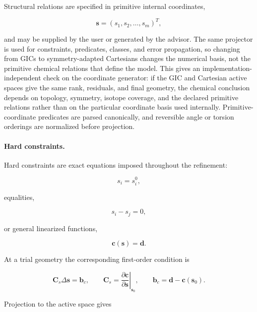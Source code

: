 \documentclass[aip,jcp,reprint,longbibliography,floatfix]{revtex4-2}
\begin{document}
Structural relations are specified in primitive internal coordinates,

\begin{equation}
\mathbf{s} = (s_1,s_2,\ldots,s_m)^T ,
\end{equation}

and may be supplied by the user or generated by the advisor. The same
projector is used for constraints, predicates, classes, and error propagation,
so changing from GICs to symmetry-adapted Cartesians changes the numerical
basis, not the primitive chemical relations that define the model.
This gives an implementation-independent check on the coordinate generator:
if the GIC and Cartesian active spaces give the same rank, residuals, and final
geometry, the chemical conclusion depends on topology, symmetry, isotope
coverage, and the declared primitive relations rather than on the particular
coordinate basis used internally.
Primitive-coordinate predicates are parsed canonically, and reversible
angle or torsion orderings are normalized before projection.

\paragraph{Hard constraints.}

Hard constraints are exact equations imposed throughout the refinement:

\begin{equation}
s_i=s_i^{0},
\end{equation}

equalities,

\begin{equation}
s_i-s_j=0,
\end{equation}

or general linearized functions,

\begin{equation}
\mathbf{c}(\mathbf{s})=\mathbf{d}.
\end{equation}

At a trial geometry the corresponding first-order condition is

\begin{equation}
\mathbf{C}_s
\Delta\mathbf{s}
=
\mathbf{b}_c,
\qquad
\mathbf{C}_s =
\left.
\frac{\partial\mathbf{c}}
{\partial\mathbf{s}}
\right|_{\mathbf{s}_0},
\qquad
\mathbf{b}_c=\mathbf{d}-\mathbf{c}(\mathbf{s}_0).
\end{equation}

Projection to the active space gives
\end{document}
